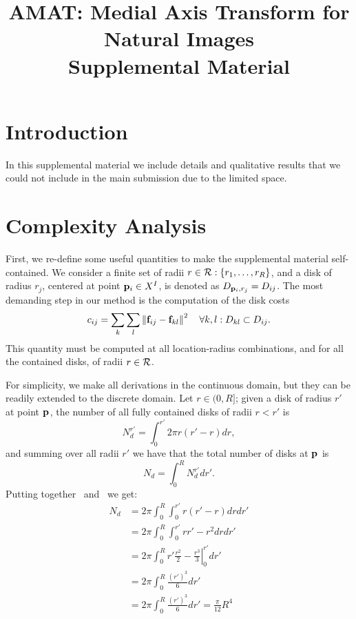 \documentclass[10pt,twocolumn,letterpaper]{article}
\begin{document}
\title{AMAT: Medial Axis Transform for Natural Images \\ Supplemental Material}
\maketitle

\section{Introduction}\label{sec:introduction}
In this supplemental material we include details and qualitative results that we could not include in the main submission due to the limited space.


\section{Complexity Analysis}\label{sec:complexity}
First, we re-define some useful quantities to make the supplemental material self-contained.
We consider a finite set of radii $r\in \mathcal{R} : \{r_1,\ldots,r_R \}$, and a disk of radius $r_j$, centered at point $\mathbf{p}_{i}\in X^I$,
is denoted as $D_{\mathbf{p}_{i},r_j} = D_{ij}$.
The most demanding step in our method is the computation of the disk costs
\begin{equation}
c_{ij} = \sum_k \sum_l \left \lVert \mathbf{f}_{ij} - \mathbf{f}_{kl}  \right \rVert^2 \quad \forall k,l: D_{kl} \subset D_{ij}.
\label{eq:diskcost}
\end{equation}
This quantity must be computed at all location-radius combinations, and for all the contained disks, of radii $r\in\mathcal{R}$.

For simplicity, we make all derivations in the continuous domain, but they can be readily extended to the discrete domain.
Let $r\in(0,R]$; given a disk of radius $r'$ at point $\mathbf{p}_{}$, the number of all fully contained disks of radii $r<r'$ is
\begin{equation}
N_d^{r'} = \int_{0}^{r'} 2 \pi r (r'-r) dr,\label{eq:ndr}
\end{equation}
and summing over all radii $r'$ we have that the total number of disks at $\mathbf{p}_{}$ is
\begin{equation}
N_d = \int_0^R N_d^{r'}dr'.\label{eq:nd}
\end{equation}
Putting together~ and~ we get:
\begin{align}
N_d & = 2\pi \int_0^{R} \int_0^{r'} r (r'-r) dr dr' \\
  & = 2\pi \int_0^{R} \int_0^{r'} rr'-r^2 dr dr' \\
  & = 2\pi \int_0^{R} \left. r'\frac{r^2}{2}-\frac{r^3}{3} \right \rvert_{0}^{r'} dr' \\
  & = 2\pi \int_0^{R} \frac{(r')^3}{6} dr' \\
  & = 2\pi \int_0^{R} \frac{(r')^3}{6} dr' = \frac{\pi}{12} R^4
\end{align}
\end{document}
